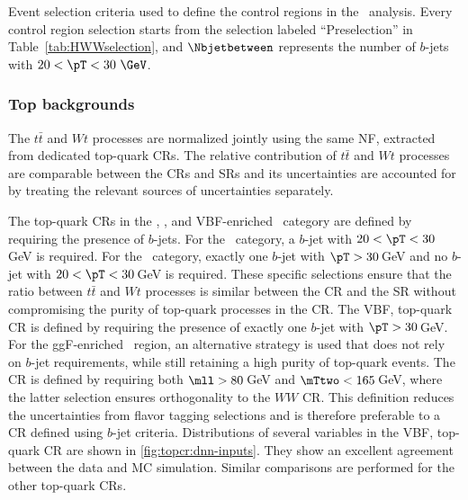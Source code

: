     
\begin{table}[!ht]
    \caption{
      Event selection criteria used to define the control regions in the \hwwenmn\ analysis.
      Every control region selection starts from the selection labeled ``Preselection'' in Table~\ref{tab:HWWselection}, and $\Nbjetbetween$ represents the number of $b$-jets with $20 < \pT < 30~\GeV$.}
  \label{tab:CRsSelection}
  \centering
  \scalebox{0.79}{
  
  }
  \end{table}
  

\subsubsection{Top backgrounds}
The $t\bar{t}$ and $Wt$ processes are normalized jointly using the same NF, extracted from dedicated top-quark CRs.
The relative contribution of $t\bar{t}$ and $Wt$ processes are comparable between the CRs and SRs and its uncertainties are accounted for by treating the relevant sources of uncertainties separately.

The top-quark CRs in the \ZeroJet, \OneJet, and VBF-enriched \TwoJet\ category are defined by requiring the presence of $b$-jets.
For the \ZeroJet\ category, a $b$-jet with $20 < \pT < 30\,$GeV is required.
For the \OneJet\ category, exactly one $b$-jet with $\pT > 30\,$GeV and no $b$-jet with $20 < \pT < 30\,$GeV is required. These specific selections ensure that the ratio between $t\bar{t}$ and $Wt$ processes is similar between the CR and the SR without compromising the purity of top-quark processes in the CR.
The VBF, top-quark CR is defined by requiring the presence of exactly one $b$-jet with $\pT > 30\,$GeV.
For the ggF-enriched \TwoJet\ region, an alternative strategy is used that does not rely on $b$-jet requirements, while still retaining a high purity of top-quark events. The CR is defined by requiring both $\mll > 80\,$GeV and $\mTtwo < 165\,$GeV, where the latter selection ensures orthogonality to the $WW$ CR. This definition reduces the uncertainties from flavor tagging selections and is therefore preferable to a CR defined using $b$-jet criteria.
Distributions of several variables in the VBF, top-quark CR are shown in \cref{fig:topcr:dnn-inputs}. They show an excellent agreement between the data and MC simulation. Similar comparisons are performed for the other top-quark CRs.

